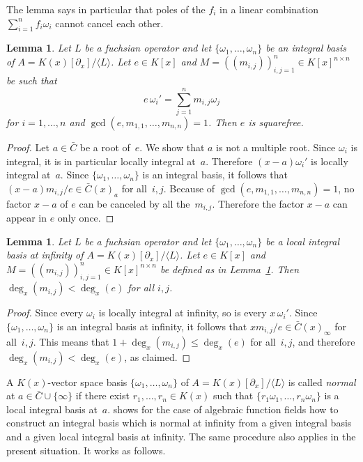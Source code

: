 \documentclass[final,1p,times,authoryear]{elsarticle}
\newtheorem{lemma}[theorem]{Lemma}
\def\<#1>{\langle#1\rangle}
\begin{document}
The lemma says in particular that poles of the $f_i$ in a linear combination
$\sum_{i=1}^n f_i\omega_i$ cannot cancel each other.

\begin{lemma}\label{lemma:e}
  Let $L$ be a fuchsian operator and let
  $\{\omega_1,\dots,\omega_n\}$ be an integral basis of $A=K(x)[\partial_x]/\<L>$.
  Let $e\in K[x]$ and
  $M=((m_{i,j}))_{i,j=1}^n\in K[x]^{n\times n}$ be such that
  \[
    e\,\omega_i'=\sum_{j=1}^n m_{i,j}\omega_j
  \]
  for $i=1,\dots,n$ and $\gcd(e,m_{1,1},\dots,m_{n,n})=1$.
  Then $e$ is squarefree.
\end{lemma}
\begin{proof}
  Let $a\in\bar C$ be a root of~$e$. We show that $a$ is not a multiple root.
  Since $\omega_i$ is integral, it is in particular locally integral at~$a$.
  Therefore $(x-a)\omega_i'$ is locally integral at~$a$.
  Since $\{\omega_1,\dots,\omega_n\}$ is an integral basis, it follows that
  $(x-a)m_{i,j}/e\in\bar C(x)_a$ for all~$i,j$.
  Because of $\gcd(e,m_{1,1},\dots,m_{n,n})=1$, no factor $x-a$ of $e$
  can be canceled by all the~$m_{i,j}$.
  Therefore the factor $x-a$ can appear in $e$ only once.
\end{proof}

\begin{lemma} \label{lemma:degM}
  Let $L$ be a fuchsian operator and let $\{\omega_1,\dots,\omega_n\}$ be a local integral
  basis at infinity of $A=K(x)[\partial_x]/\<L>$. Let $e\in K[x]$ and $M=((m_{i,j}))_{i,j=1}^n\in K[x]^{n\times n}$
  be defined as in Lemma~\ref{lemma:e}. Then $\deg_x(m_{i,j})<\deg_x(e)$ for all $i,j$.
\end{lemma}
\begin{proof}
  Since every $\omega_i$ is locally integral at infinity, so is every $x\,\omega_i'$.
  Since $\{\omega_1,\dots,\omega_n\}$ is an integral basis at infinity, it follows that
  $xm_{i,j}/e\in\bar C(x)_\infty$ for all~$i,j$. This means that $1+\deg_x(m_{i,j})\leq\deg_x(e)$
  for all~$i,j$, and therefore $\deg_x(m_{i,j})<\deg_x(e)$, as claimed.
\end{proof}

A $K(x)$-vector space basis $\{\omega_1,\dots,\omega_n\}$ of $A=K(x)[\partial_x]/\<L>$ is
called \emph{normal} at $a\in\bar C\cup\{\infty\}$ if there exist $r_1,\dots,r_n\in
K(x)$ such that $\{r_1\omega_1,\dots,r_n\omega_n\}$ is a local integral basis
at~$a$. \cite{trager84} shows for the case of algebraic function fields how to construct
an integral basis which is normal at infinity from a given integral basis and
a given local integral basis at infinity. The same procedure also applies
in the present situation. It works as follows.
\end{document}
